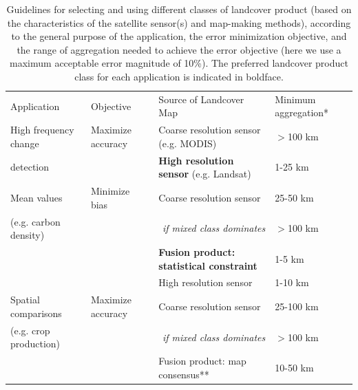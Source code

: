 \documentclass{pnastwo2}
\begin{document}
\begin{article}
\begin{table}[!h]
  \begin{threeparttable}
    \caption{Guidelines for selecting and using different classes of landcover product (based on the characteristics of the satellite sensor(s) and map-making methods), according to the general purpose of the application, the error minimization objective, and the range of aggregation needed to achieve the error objective (here we use a maximum acceptable error magnitude of 10\%). The preferred landcover product class for each application is indicated in boldface. }
    \begin{center}
      \begin{tabular}{p{4.5cm}lp{6cm}l}
       \hline
Application                     & Objective & Source of Landcover Map & Minimum aggregation* \\
\Xhline{1pt}
High frequency change           & Maximize accuracy   & Coarse resolution sensor (e.g. MODIS) & $>$100 km\\
detection                                                               &                                  & \textbf{High resolution sensor} (e.g. Landsat)   &  1-25 km\\
\hline
Mean values         & Minimize bias            & Coarse resolution sensor  & 25-50 km \\
(e.g. carbon density)                                                              &                                   &  \multicolumn{1}{r}{\emph{if mixed class dominates}}                                    & $>$100 km \\
                                                              &                                   & \textbf{Fusion product: statistical constraint} & 1-5 km\\
                                                              &                                   & High resolution sensor & 1-10 km\\
\hline
Spatial comparisons & Maximize accuracy  & Coarse resolution sensor & 25-100 km\\
 (e.g. crop production)                                                               &                                   &  \multicolumn{1}{r}{\emph{if mixed class dominates}}                                    & $>$100 km \\
                                                             &                                   & Fusion product: map consensus** & 10-50 km\\

\end{tabular}
\end{center}
\end{threeparttable}
\end{table}
\end{article}
\end{document}
